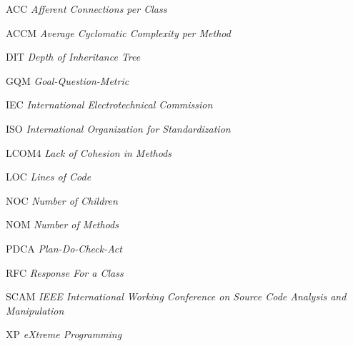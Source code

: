 \begin{siglas}

\item [ACC\label{itm:vehicle}]   \textit{Afferent Connections per Class}
\item [ACCM]  \textit{Average Cyclomatic Complexity per Method}
\item [DIT]	  \textit{Depth of Inheritance Tree}
\item [GQM]   \textit{Goal-Question-Metric}
\item [IEC]   \textit{International Electrotechnical Commission}
\item [ISO]   \textit{International Organization for Standardization}
\item [LCOM4] \textit{Lack of Cohesion in Methods}
\item [LOC]   \textit{Lines of Code}
\item [NOC]   \textit{Number of Children}
\item [NOM]   \textit{Number of Methods}
\item [PDCA]  \textit{Plan-Do-Check-Act}
\item [RFC]   \textit{Response For a Class}
\item [SCAM]  \textit{IEEE International Working Conference on Source Code Analysis and Manipulation}
\item [XP]    \textit{eXtreme Programming}
  
\end{siglas}
